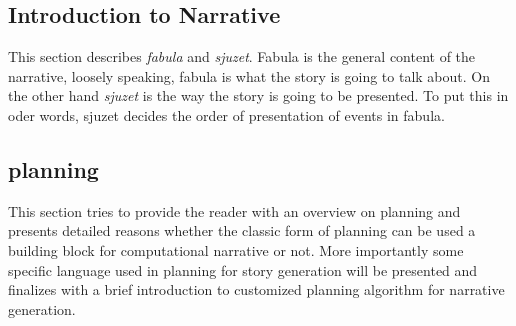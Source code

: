 \documentclass[english]{tktltiki}
\begin{document}
\subsection{Introduction to Narrative}
This section describes \textit{fabula} and \textit{sjuzet}.
Fabula is the general content of the narrative, loosely speaking, fabula is what the story is going to talk about. On the other hand \textit{sjuzet} is the way the story is going to be presented. To put this in oder words, sjuzet decides the order of presentation of events in fabula.
\subsection{planning}
This section tries to provide the reader with an overview on planning and presents detailed reasons whether the classic form of planning can be used a building block for computational narrative or not. More importantly some specific language used in planning for story generation will be presented and finalizes with a brief introduction to customized planning algorithm for narrative generation. 
\end{document}
